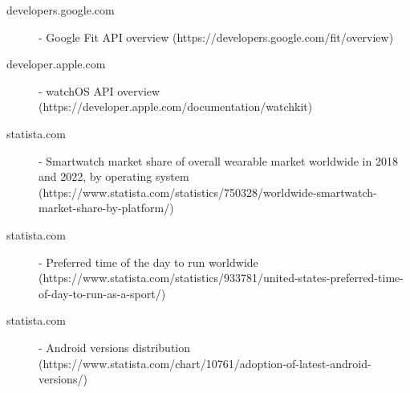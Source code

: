 \documentclass[../main.tex]{subfiles}
\begin{document}
\begin{description}
	\item [developers.google.com] - Google Fit API overview (https://developers.google.com/fit/overview)
	\item [developer.apple.com] - watchOS API overview (https://developer.apple.com/documentation/watchkit)
	\item [statista.com] - Smartwatch market share of overall wearable market worldwide in 2018 and 2022, by operating system (https://www.statista.com/statistics/750328/worldwide-smartwatch-market-share-by-platform/)
	\item [statista.com] - Preferred time of the day to run worldwide (https://www.statista.com/statistics/933781/united-states-preferred-time-of-day-to-run-as-a-sport/)
	\item [statista.com] - Android versions distribution (https://www.statista.com/chart/10761/adoption-of-latest-android-versions/)
\end{description}
\end{document}
